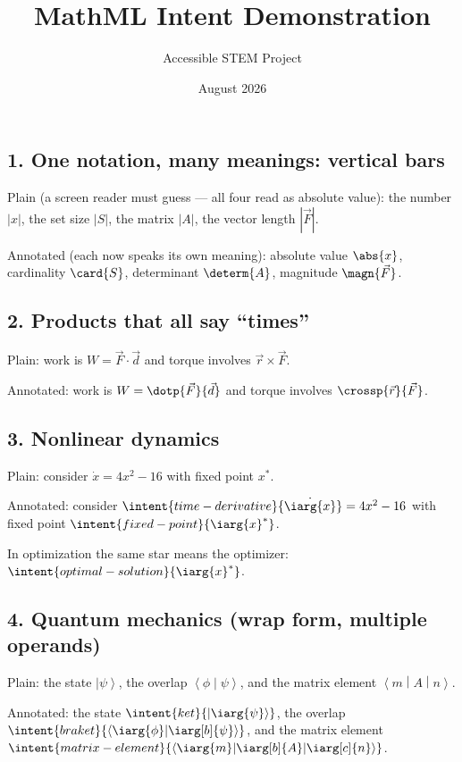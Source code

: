 \documentclass[11pt]{article}
\title{MathML Intent Demonstration}
\author{Accessible STEM Project}
\date{August 2026}
\begin{document}
\maketitle

\subsection*{1. One notation, many meanings: vertical bars}

Plain (a screen reader must guess --- all four read as absolute value):
the number $|x|$, the set size $|S|$, the matrix $|A|$, the vector length
$|\vec{F}|$.

Annotated (each now speaks its own meaning):
absolute value $\abs{x}$, cardinality $\card{S}$, determinant $\determ{A}$,
magnitude $\magn{\vec{F}}$.

\subsection*{2. Products that all say ``times''}

Plain: work is $W = \vec{F}\cdot\vec{d}$ and torque involves
$\vec{r}\times\vec{F}$.

Annotated: work is $W = \dotp{\vec{F}}{\vec{d}}$ and torque involves
$\crossp{\vec{r}}{\vec{F}}$.

\subsection*{3. Nonlinear dynamics}

Plain: consider $\dot{x} = 4x^2 - 16$ with fixed point $x^*$.

Annotated: consider $\intent{time-derivative}{\dot{\iarg{x}}} = 4x^2 - 16$
with fixed point $\intent{fixed-point}{{\iarg{x}}^*}$.

In optimization the same star means the optimizer:
$\intent{optimal-solution}{{\iarg{x}}^*}$.

\subsection*{4. Quantum mechanics (wrap form, multiple operands)}

Plain: the state $\left|\psi\right\rangle$, the overlap
$\left\langle\phi\middle|\psi\right\rangle$, and the matrix element
$\left\langle m\middle|A\middle|n\right\rangle$.

Annotated: the state $\intent{ket}{\left|\iarg{\psi}\right\rangle}$,
the overlap
$\intent{braket}{\left\langle\iarg{\phi}\middle|\iarg[b]{\psi}\right\rangle}$,
and the matrix element
$\intent{matrix-element}{\left\langle\iarg{m}\middle|\iarg[b]{A}\middle|\iarg[c]{n}\right\rangle}$.
\end{document}
